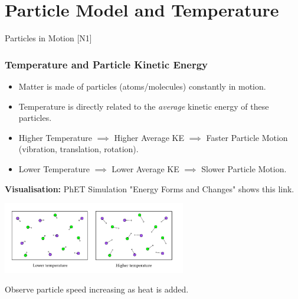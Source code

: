 \documentclass[xcolor=svgnames]{beamer}
\begin{document}
\section{Particle Model and Temperature}
\begin{frame}{Particles in Motion [N1]}
    \frametitle{Temperature and Particle Kinetic Energy}
    \begin{itemize}
        \item Matter is made of particles (atoms/molecules) constantly in motion.
        \item Temperature is directly related to the \textit{average} kinetic energy of these particles.
        \item Higher Temperature $\implies$ Higher Average KE $\implies$ Faster Particle Motion (vibration, translation, rotation).
        \item Lower Temperature $\implies$ Lower Average KE $\implies$ Slower Particle Motion.
    \end{itemize}
    \vspace{1em}
    \textbf{Visualisation:} PhET Simulation "Energy Forms and Changes" shows this link.
    \begin{center}
    \includegraphics[width=0.6\textwidth]{img/phet_particles.png} %
    \end{center}
    Observe particle speed increasing as heat is added.
\end{frame}
\end{document}
